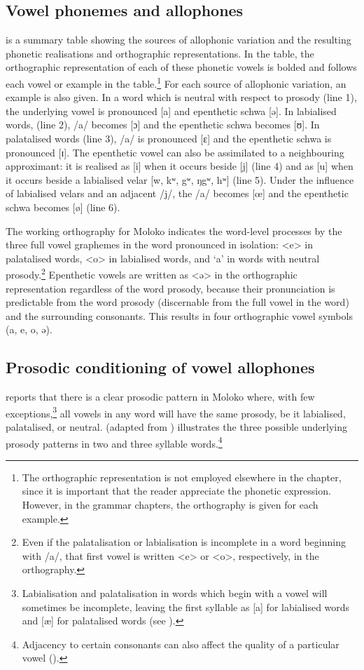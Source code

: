 \subsection{Vowel phonemes and allophones}\label{sec:2.3.1}
\hypertarget{RefHeading1210561525720847}{}
 is a summary table showing the sources of allophonic variation and the resulting phonetic realisations and orthographic representations. In the table, the orthographic representation of each of these phonetic vowels is bolded and follows each vowel or example in the table.\footnote{The orthographic representation is not employed elsewhere in the chapter, since it is important that the reader appreciate the phonetic expression. However, in the grammar chapters, the orthography is given for each example. } For each source of allophonic variation, an example is also given. In a word which is neutral with respect to prosody (line 1), the underlying vowel is pronounced [a] and epenthetic schwa [ə]. In labialised words, (line 2), /a/ becomes [ɔ] and the epenthetic schwa becomes [ʊ].  In palatalised words (line 3), /a/ is pronounced [ɛ] and the epenthetic schwa is pronounced [ɪ]. The epenthetic vowel can also be assimilated to a neighbouring approximant: it is realised as [i] when it occurs beside [j] (line 4) and as [u] when it occurs beside a labialised velar [w, kʷ, gʷ, ŋgʷ, hʷ] (line 5). Under the influence of labialised velars and an adjacent /j/, the /a/ becomes [œ] and the epenthetic schwa becomes [ø] (line 6).

The working orthography for Moloko \citep{Friesen2001} indicates the word-level processes by the three full vowel graphemes in the word pronounced in isolation: <e> in palatalised words, <o> in labialised words, and ‘a’ in words with neutral prosody.\footnote{Even if the palatalisation or labialisation is incomplete in a word beginning with /a/, that first vowel is written <e> or <o>, respectively, in the orthography. }  Epenthetic vowels are written as <ə> in the orthographic representation regardless of the word prosody, because their pronunciation is predictable from the word prosody (discernable from the full vowel in the word) and the surrounding consonants.  This results in four orthographic vowel symbols (a, e, o, ə).

\subsection{Prosodic conditioning of vowel allophones}\label{sec:2.3.2}
\hypertarget{RefHeading1210581525720847}{}
\citet{Bow1997c} reports that there is a clear prosodic pattern in Moloko where, with  few exceptions,\footnote{Labialisation and palatalisation in words which begin with a vowel will sometimes be incomplete, leaving the first syllable as [a] for labialised words and [æ] for palatalised words (see ).} all vowels in any word will have the same prosody, be it labialised, palatalised, or neutral.   (adapted from \citealt{Bow1997c}) illustrates the three possible underlying prosody patterns in two and three syllable words.\footnote{Adjacency to certain consonants can also affect the quality of a particular vowel ().}


